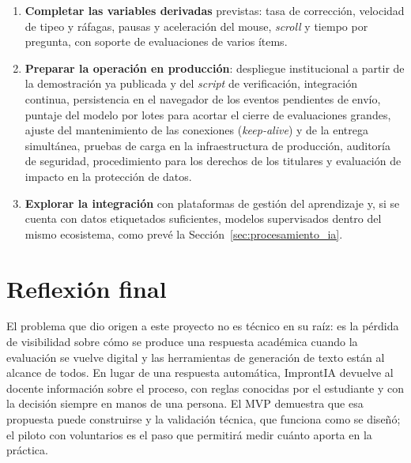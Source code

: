 \begin{enumerate}
    \item \textbf{Completar las variables derivadas} previstas: tasa de corrección, velocidad de tipeo y ráfagas, pausas y aceleración del mouse, \textit{scroll} y tiempo por pregunta, con soporte de evaluaciones de varios ítems.
    \item \textbf{Preparar la operación en producción}: despliegue institucional a partir de la demostración ya publicada y del \textit{script} de verificación, integración continua, persistencia en el navegador de los eventos pendientes de envío, puntaje del modelo por lotes para acortar el cierre de evaluaciones grandes, ajuste del mantenimiento de las conexiones (\textit{keep-alive}) y de la entrega simultánea, pruebas de carga en la infraestructura de producción, auditoría de seguridad, procedimiento para los derechos de los titulares y evaluación de impacto en la protección de datos.
    \item \textbf{Explorar la integración} con plataformas de gestión del aprendizaje y, si se cuenta con datos etiquetados suficientes, modelos supervisados dentro del mismo ecosistema, como prevé la Sección~\ref{sec:procesamiento_ia}.
\end{enumerate}

\section{Reflexión final}

El problema que dio origen a este proyecto no es técnico en su raíz: es la pérdida de visibilidad sobre cómo se produce una respuesta académica cuando la evaluación se vuelve digital y las herramientas de generación de texto están al alcance de todos. En lugar de una respuesta automática, ImprontIA devuelve al docente información sobre el proceso, con reglas conocidas por el estudiante y con la decisión siempre en manos de una persona. El MVP demuestra que esa propuesta puede construirse y la validación técnica, que funciona como se diseñó; el piloto con voluntarios es el paso que permitirá medir cuánto aporta en la práctica.
